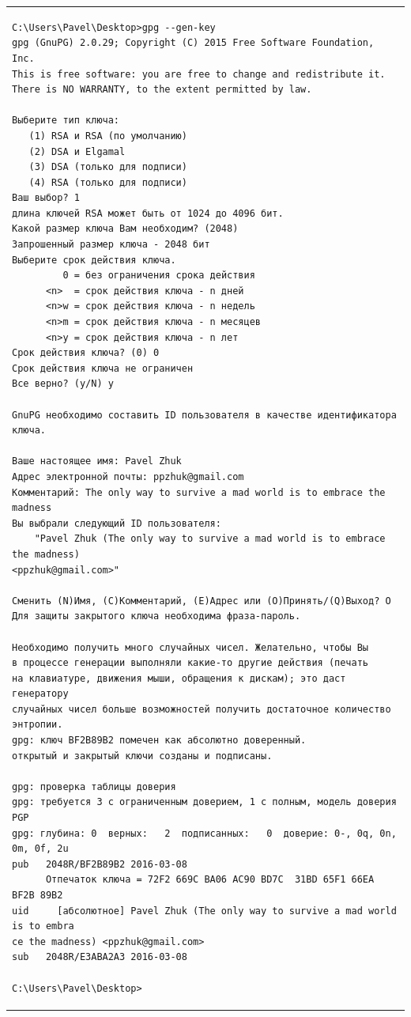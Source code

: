 \documentclass[10pt,a4paper,titlepage]{article}
\begin{document}
\begin{tabular}{|p{16cm}|}
\begin{verbatim}
C:\Users\Pavel\Desktop>gpg --gen-key
gpg (GnuPG) 2.0.29; Copyright (C) 2015 Free Software Foundation, Inc.
This is free software: you are free to change and redistribute it.
There is NO WARRANTY, to the extent permitted by law.

Выберите тип ключа:
   (1) RSA и RSA (по умолчанию)
   (2) DSA и Elgamal
   (3) DSA (только для подписи)
   (4) RSA (только для подписи)
Ваш выбор? 1
длина ключей RSA может быть от 1024 до 4096 бит.
Какой размер ключа Вам необходим? (2048)
Запрошенный размер ключа - 2048 бит
Выберите срок действия ключа.
         0 = без ограничения срока действия
      <n>  = срок действия ключа - n дней
      <n>w = срок действия ключа - n недель
      <n>m = срок действия ключа - n месяцев
      <n>y = срок действия ключа - n лет
Срок действия ключа? (0) 0
Срок действия ключа не ограничен
Все верно? (y/N) y

GnuPG необходимо составить ID пользователя в качестве идентификатора ключа.

Ваше настоящее имя: Pavel Zhuk
Адрес электронной почты: ppzhuk@gmail.com
Комментарий: The only way to survive a mad world is to embrace the madness
Вы выбрали следующий ID пользователя:
    "Pavel Zhuk (The only way to survive a mad world is to embrace the madness)
<ppzhuk@gmail.com>"

Сменить (N)Имя, (C)Комментарий, (E)Адрес или (O)Принять/(Q)Выход? O
Для защиты закрытого ключа необходима фраза-пароль.

Необходимо получить много случайных чисел. Желательно, чтобы Вы
в процессе генерации выполняли какие-то другие действия (печать
на клавиатуре, движения мыши, обращения к дискам); это даст генератору
случайных чисел больше возможностей получить достаточное количество энтропии.
gpg: ключ BF2B89B2 помечен как абсолютно доверенный.
открытый и закрытый ключи созданы и подписаны.

gpg: проверка таблицы доверия
gpg: требуется 3 с ограниченным доверием, 1 с полным, модель доверия PGP
gpg: глубина: 0  верных:   2  подписанных:   0  доверие: 0-, 0q, 0n, 0m, 0f, 2u
pub   2048R/BF2B89B2 2016-03-08
      Отпечаток ключа = 72F2 669C BA06 AC90 BD7C  31BD 65F1 66EA BF2B 89B2
uid     [абсолютное] Pavel Zhuk (The only way to survive a mad world is to embra
ce the madness) <ppzhuk@gmail.com>
sub   2048R/E3ABA2A3 2016-03-08

C:\Users\Pavel\Desktop>
\end{verbatim}
\end{tabular}\\
\end{document}
